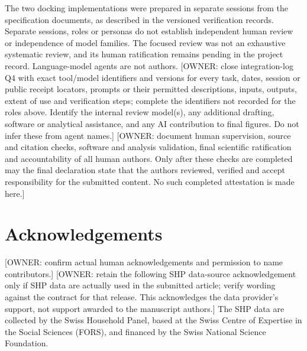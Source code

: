 The two docking implementations were prepared in separate sessions from the
specification documents, as described in the versioned verification records.
Separate sessions, roles or personas do not establish independent human review
or independence of model families. The focused review was not an exhaustive
systematic review, and its human ratification remains pending in the project record.
Language-model agents are not authors.
[OWNER: close integration-log Q4 with exact tool/model identifiers and versions
for every task, dates, session or public receipt locators, prompts or their
permitted descriptions, inputs, outputs, extent of use and verification steps;
complete the identifiers not recorded for the roles above. Identify the internal
review model(s), any additional drafting, software or analytical assistance,
and any AI contribution to final figures. Do not infer these from agent names.]
[OWNER: document human supervision, source and citation checks, software and
analysis validation, final scientific ratification and accountability of all
human authors. Only after these checks are completed may the final declaration
state that the authors reviewed, verified and accept responsibility for the
submitted content. No such completed attestation is made here.]


\section*{Acknowledgements}
[OWNER: confirm actual human acknowledgements and permission to name contributors.]
[OWNER: retain the following SHP data-source acknowledgement only if SHP data
are actually used in the submitted article; verify wording against the contract
for that release. This acknowledges the data provider's support, not support
awarded to the manuscript authors.]
The SHP data are collected by the Swiss Household Panel, based at the Swiss
Centre of Expertise in the Social Sciences (FORS), and financed by the Swiss
National Science Foundation.
